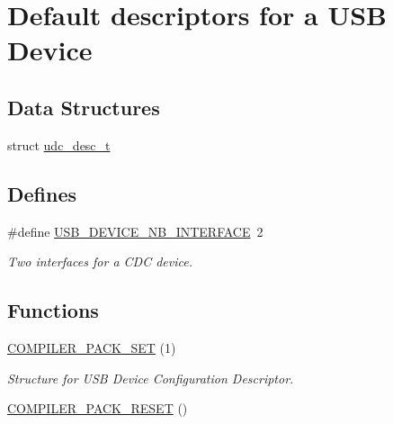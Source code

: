 \hypertarget{group__udi__cdc__group__desc}{
\section{\-Default descriptors for a \-U\-S\-B \-Device}
\label{group__udi__cdc__group__desc}
}
\subsection*{\-Data \-Structures}
\begin{DoxyCompactItemize}
\item 
struct \hyperlink{structudc__desc__t}{udc\-\_\-desc\-\_\-t}
\end{DoxyCompactItemize}
\subsection*{\-Defines}
\begin{DoxyCompactItemize}
\item 
\#define \hyperlink{group__udi__cdc__group__desc_gad079423a5116ebac5e26628447e0d0c1}{\-U\-S\-B\-\_\-\-D\-E\-V\-I\-C\-E\-\_\-\-N\-B\-\_\-\-I\-N\-T\-E\-R\-F\-A\-C\-E}~2
\begin{DoxyCompactList}\small\item\em \-Two interfaces for a \-C\-D\-C device. \end{DoxyCompactList}\end{DoxyCompactItemize}
\subsection*{\-Functions}
\begin{DoxyCompactItemize}
\item 
\hyperlink{group__udi__cdc__group__desc_ga14096700b3ed8c5168615c5c5ee1c68d}{\-C\-O\-M\-P\-I\-L\-E\-R\-\_\-\-P\-A\-C\-K\-\_\-\-S\-E\-T} (1)
\begin{DoxyCompactList}\small\item\em \-Structure for \-U\-S\-B \-Device \-Configuration \-Descriptor. \end{DoxyCompactList}\item 
\hyperlink{group__udi__cdc__group__desc_gabe317a1520896eaf568afab27dc71540}{\-C\-O\-M\-P\-I\-L\-E\-R\-\_\-\-P\-A\-C\-K\-\_\-\-R\-E\-S\-E\-T} ()
\end{DoxyCompactItemize}
